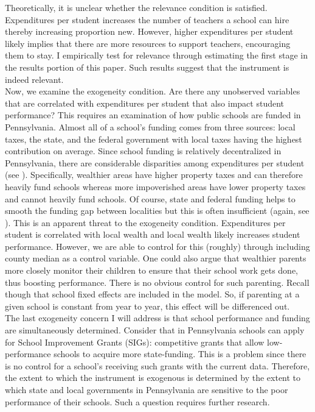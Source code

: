 \documentclass[12pt]{report}
\begin{document}
\doublespacing
\noindent Theoretically, it is unclear whether the relevance condition is satisfied. Expenditures per student increases the number of teachers a school can hire thereby increasing proportion new. However, higher expenditures per student likely implies that there are more resources to support teachers, encouraging them to stay. I empirically test for relevance through estimating the first stage in the results portion of this paper. Such results suggest that the instrument is indeed relevant. \\
\indent Now, we examine the exogeneity condition. Are there any unobserved variables that are correlated with expenditures per student that also impact student performance? This requires an examination of how public schools are funded in Pennsylvania. Almost all of a school's funding comes from three sources: local taxes, the state, and the federal government with local taxes having the highest contribution on average. Since school funding is relatively decentralized in Pennsylvania, there are considerable disparities among expenditures per student (see \cite{funding}). Specifically, wealthier areas have higher property taxes and can therefore heavily fund schools whereas more impoverished areas have lower property taxes and cannot heavily fund schools. Of course, state and federal funding helps to smooth the funding gap between localities but this is often insufficient (again, see \cite{funding}). This is an apparent threat to the exogeneity condition. Expenditures per student is correlated with local wealth and local wealth likely increases student performance. However, we are able to control for this (roughly) through including county median as a control variable. One could also argue that wealthier parents more closely monitor their children to ensure that their school work gets done, thus boosting performance. There is no obvious control for such parenting. Recall though that school fixed effects are included in the model. So, if parenting at a given school is constant from year to year, this effect will be differenced out.\\ 
\indent The last exogeneity concern I will address is that school performance and funding are simultaneously determined. Consider that in Pennsylvania schools can apply for School Improvement Grants (SIGs): competitive grants that allow low-performance schools to acquire more state-funding. This is a problem since there is no control for a school's receiving such grants with the current data. Therefore, the extent to which the instrument is exogenous is determined by the extent to which state and local governments in Pennsylvania are sensitive to the poor performance of their schools. Such a question requires further research.\\
\end{document}
